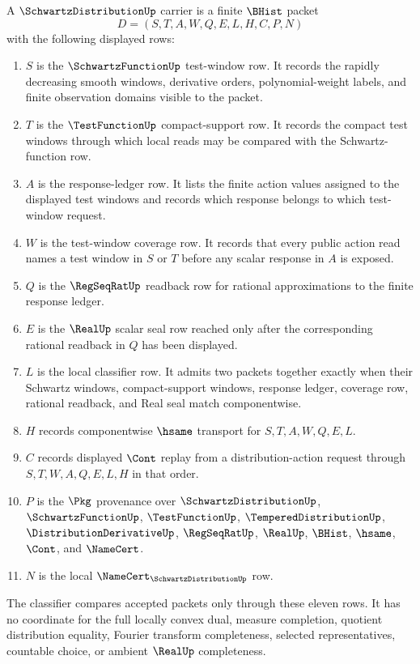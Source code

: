 \begin{definition}\label{def:schwartz-distribution-carrier}
A $\SchwartzDistributionUp$ carrier is a finite $\BHist$ packet
$$
D=(S,T,A,W,Q,E,L,H,C,P,N)
$$
with the following displayed rows:
\begin{enumerate}
\item $S$ is the $\SchwartzFunctionUp$ test-window row. It records the rapidly decreasing smooth windows, derivative orders, polynomial-weight labels, and finite observation domains visible to the packet.
\item $T$ is the $\TestFunctionUp$ compact-support row. It records the compact test windows through which local reads may be compared with the Schwartz-function row.
\item $A$ is the response-ledger row. It lists the finite action values assigned to the displayed test windows and records which response belongs to which test-window request.
\item $W$ is the test-window coverage row. It records that every public action read names a test window in $S$ or $T$ before any scalar response in $A$ is exposed.
\item $Q$ is the $\RegSeqRatUp$ readback row for rational approximations to the finite response ledger.
\item $E$ is the $\RealUp$ scalar seal row reached only after the corresponding rational readback in $Q$ has been displayed.
\item $L$ is the local classifier row. It admits two packets together exactly when their Schwartz windows, compact-support windows, response ledger, coverage row, rational readback, and Real seal match componentwise.
\item $H$ records componentwise $\hsame$ transport for $S,T,A,W,Q,E,L$.
\item $C$ records displayed $\Cont$ replay from a distribution-action request through $S,T,W,A,Q,E,L,H$ in that order.
\item $P$ is the $\Pkg$ provenance over $\SchwartzDistributionUp$, $\SchwartzFunctionUp$, $\TestFunctionUp$, $\TemperedDistributionUp$, $\DistributionDerivativeUp$, $\RegSeqRatUp$, $\RealUp$, $\BHist$, $\hsame$, $\Cont$, and $\NameCert$.
\item $N$ is the local $\NameCert_{\SchwartzDistributionUp}$ row.
\end{enumerate}
The classifier compares accepted packets only through these eleven rows. It has no coordinate for the full locally convex dual, measure completion, quotient distribution equality, Fourier transform completeness, selected representatives, countable choice, or ambient $\RealUp$ completeness.
\end{definition}

